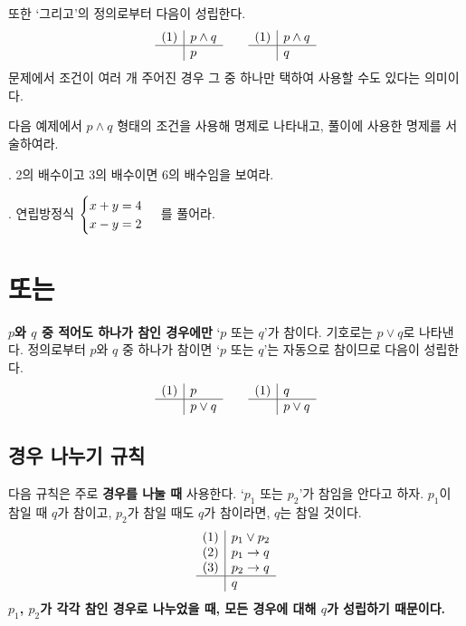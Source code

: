 또한 `그리고'의 정의로부터 다음이 성립한다.
\[
    \begin{array}{c|l}
        (1) & p \wedge q \\\hline & p
    \end{array}
    \qquad
    \begin{array}{c|l}
        (1) & p \wedge q \\\hline & q
    \end{array}
\]
문제에서 조건이 여러 개 주어진 경우 그 중 하나만 택하여 사용할 수도 있다는 의미이다.

\bigskip

다음 예제에서 \(p \wedge q\) 형태의 조건을 사용해 명제로 나타내고, 풀이에 사용한 명제를 서술하여라.

\ex. 2의 배수이고 3의 배수이면 6의 배수임을 보여라.

\vspace*{180px}

\ex. 연립방정식 \(\displaystyle \begin{cases}
    x + y = 4 \\ x - y = 2
\end{cases}\) 를 풀어라.

\pagebreak

\section{또는}

\textbf{\(p\)와 \(q\) 중 적어도 하나가 참인 경우에만} `\(p\) 또는 \(q\)'가 참이다. 기호로는 \(p \vee q\)로 나타낸다. 정의로부터 \(p\)와 \(q\) 중 하나가 참이면 `\(p\) 또는 \(q\)'는 자동으로 참이므로 다음이 성립한다.
\[
    \begin{array}{c|l}
        (1) & p \\\hline & p \vee q
    \end{array}
    \qquad
    \begin{array}{c|l}
        (1) & q \\\hline & p \vee q
    \end{array}
\]

\subsection{경우 나누기 규칙}

다음 규칙은 주로 \textbf{경우를 나눌 때} 사용한다. `\(p_1\) 또는 \(p_2\)'가 참임을 안다고 하자. \(p_1\)이 참일 때 \(q\)가 참이고, \(p_2\)가 참일 때도 \(q\)가 참이라면, \(q\)는 참일 것이다.
\[
    \begin{array}{c|l}
        (1) & p_1 \vee p_2 \\ (2) & p_1 \rightarrow q \\ (3) & p_2 \rightarrow q \\\hline & q
    \end{array}
\]
\textbf{\(p_1\), \(p_2\)가 각각 참인 경우로 나누었을 때, 모든 경우에 대해 \(q\)가 성립하기 때문이다.}


